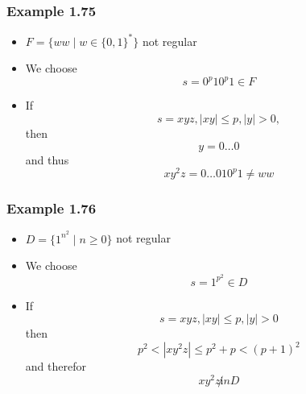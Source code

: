 \begin{frame}[allowframebreaks] \frametitle{Example 1.75}
  \begin{itemize}
\item $F=\{ww\mid w \in \{0,1\}^*\}$ not regular
\item We choose
  \begin{equation*}
s=0^p 1 0^p 1 \in F
\end{equation*}
\item If
  \begin{equation*}
    s =xyz,
    |xy|
\leq p, |y|>0,
\end{equation*}
then
\begin{equation*}
 y = 0\ldots 0
\end{equation*}
and thus
\begin{equation*}
xy^2z = 0 \ldots 0 1 0^p 1\neq ww
\end{equation*}
\end{itemize}\end{frame} \begin{frame}[allowframebreaks] \frametitle{Example 1.76}
  \begin{itemize}
\item $D=\{1^{n^2}
\mid n \geq 0\}$ not regular
\item We choose
  \begin{equation*}
  s=1^{p^2} \in D
\end{equation*}
\item If 
  \begin{equation*}
s =xyz, |xy |\leq p, |y|>0
\end{equation*}
then 
\begin{equation*}
p^2 < |xy^2z| \leq p^2 +p < (p+1)^2
\end{equation*}
and therefor
\begin{equation*}
  xy^2 z \not in D
\end{equation*}
\end{itemize}\end{frame}


